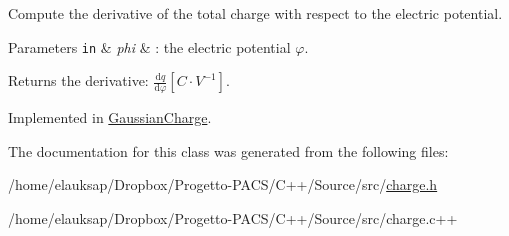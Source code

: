 Compute the derivative of the total charge with respect to the electric potential. 


\begin{DoxyParams}[1]{Parameters}
\mbox{\tt in}  & {\em phi} & \-: the electric potential $ \varphi $. \\
\hline
\end{DoxyParams}
\begin{DoxyReturn}{Returns}
the derivative\-: $ \frac{\mathrm{d}q}{\mathrm{d}\varphi} \left[ C \cdot V^{-1} \right] $. 
\end{DoxyReturn}


Implemented in \hyperlink{classGaussianCharge_a06f7a60ee2bce4590e2a12286aa0e9eb}{Gaussian\-Charge}.



The documentation for this class was generated from the following files\-:\begin{DoxyCompactItemize}
\item 
/home/elauksap/\-Dropbox/\-Progetto-\/\-P\-A\-C\-S/\-C++/\-Source/src/\hyperlink{charge_8h}{charge.\-h}\item 
/home/elauksap/\-Dropbox/\-Progetto-\/\-P\-A\-C\-S/\-C++/\-Source/src/charge.\-c++\end{DoxyCompactItemize}
